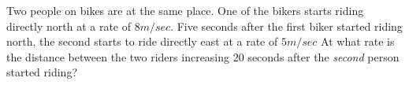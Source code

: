 \begin{questions}
    \horizontalline

    
    \horizontalline

    \newpage

    \question Two people on bikes are at the same place. One of the bikers starts riding directly north at a rate of $8 \si{m \per sec}$. Five seconds after the first biker started riding north, the second starts to ride directly east at a rate of $5 \si{m \per sec}$ At what rate is the distance between the two riders increasing $20$ seconds after the \textit{second} person started riding? 

    \vfill

    \horizontalline
\end{questions}

\newpage

\pagecolor{white}
